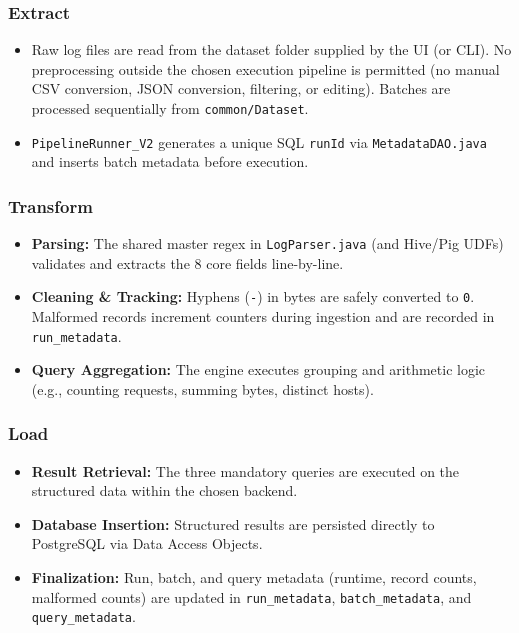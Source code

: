 \documentclass[11pt,a4paper]{article}
\begin{document}
\subsubsection{Extract}
\begin{itemize}
  \item Raw log files are read from the dataset folder supplied by the UI (or CLI). No preprocessing outside the chosen execution pipeline is permitted (no manual CSV conversion, JSON conversion, filtering, or editing). Batches are processed sequentially from \texttt{common/Dataset}.
  \item \texttt{PipelineRunner\_V2} generates a unique SQL \texttt{runId} via \texttt{MetadataDAO.java} and inserts batch metadata before execution.
\end{itemize}

\subsubsection{Transform}
\begin{itemize}
  \item \textbf{Parsing:} The shared master regex in \texttt{LogParser.java} (and Hive/Pig UDFs) validates and extracts the 8 core fields line-by-line.
  \item \textbf{Cleaning \& Tracking:} Hyphens (\texttt{-}) in bytes are safely converted to \texttt{0}. Malformed records increment counters during ingestion and are recorded in \texttt{run\_metadata}.
  \item \textbf{Query Aggregation:} The engine executes grouping and arithmetic logic (e.g., counting requests, summing bytes, distinct hosts).
\end{itemize}

\subsubsection{Load}
\begin{itemize}
  \item \textbf{Result Retrieval:} The three mandatory queries are executed on the structured data within the chosen backend.
  \item \textbf{Database Insertion:} Structured results are persisted directly to PostgreSQL via Data Access Objects.
  \item \textbf{Finalization:} Run, batch, and query metadata (runtime, record counts, malformed counts) are updated in \texttt{run\_metadata}, \texttt{batch\_metadata}, and \texttt{query\_metadata}.
\end{itemize}
\end{document}
